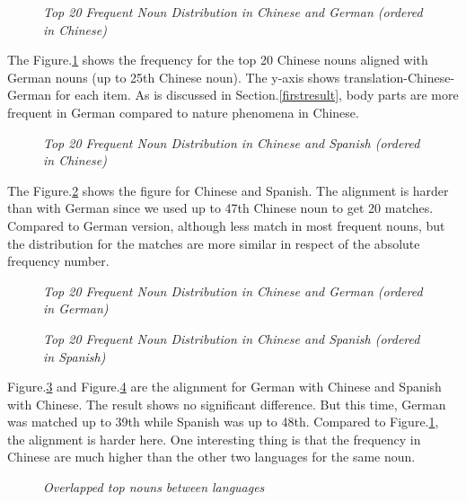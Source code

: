 \begin{figure}[t]
\centerline{}
\caption{{\it Top 20 Frequent Noun Distribution in Chinese and German (ordered in Chinese)}}
\label{fig1}
\end{figure}

The Figure.\ref{fig1} shows the frequency for the top 20 Chinese nouns aligned with German nouns (up to 25th Chinese noun). The y-axis shows translation-Chinese-German for each item. As is discussed in Section.\ref{firstresult}, body parts are more frequent in German compared to nature phenomena in Chinese. 

\begin{figure}[t]
\centerline{}
\caption{{\it Top 20 Frequent Noun Distribution in Chinese and Spanish (ordered in Chinese)}}
\label{fig2}
\end{figure}

The Figure.\ref{fig2} shows the figure for Chinese and Spanish. The alignment is harder than with German since we used up to 47th Chinese noun to get 20 matches. Compared to German version, although less match in most frequent nouns, but the distribution for the matches are more similar in respect of the absolute frequency number. 

\begin{figure}[t]
\centerline{}
\caption{{\it Top 20 Frequent Noun Distribution in Chinese and German (ordered in German)}}
\label{fig3}
\end{figure}

\begin{figure}[t]
\centerline{}
\caption{{\it Top 20 Frequent Noun Distribution in Chinese and Spanish (ordered in Spanish)}}
\label{fig4}
\end{figure}

Figure.\ref{fig3} and Figure.\ref{fig4} are the alignment for German with Chinese and Spanish with Chinese. The result shows no significant difference. But this time, German was matched up to 39th while Spanish was up to 48th. Compared to Figure.\ref{fig1}, the alignment is harder here. One interesting thing is that the frequency in Chinese are much higher than the other two languages for the same noun. 

\begin{figure}[t]
\centerline{}
\caption{{\it Overlapped top nouns between languages}}
\label{fig5}
\end{figure}

